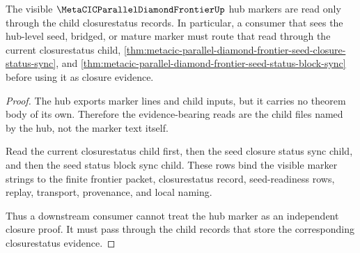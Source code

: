 \begin{lemma}
\label{lem:metacic-parallel-diamond-frontier-closure-marker-consistency}
The visible $\MetaCICParallelDiamondFrontierUp$ hub markers are read only through the child closurestatus records. In particular, a consumer that sees the hub-level seed, bridged, or mature marker must route that read through the current closurestatus child, \autoref{thm:metacic-parallel-diamond-frontier-seed-closure-status-sync}, and \autoref{thm:metacic-parallel-diamond-frontier-seed-status-block-sync} before using it as closure evidence.
\end{lemma}
\begin{proof}
The hub exports marker lines and child inputs, but it carries no theorem body of its own. Therefore the evidence-bearing reads are the child files named by the hub, not the marker text itself.

Read the current closurestatus child first, then the seed closure status sync child, and then the seed status block sync child. These rows bind the visible marker strings to the finite frontier packet, closurestatus record, seed-readiness rows, replay, transport, provenance, and local naming.

Thus a downstream consumer cannot treat the hub marker as an independent closure proof. It must pass through the child records that store the corresponding closurestatus evidence.
\end{proof}
